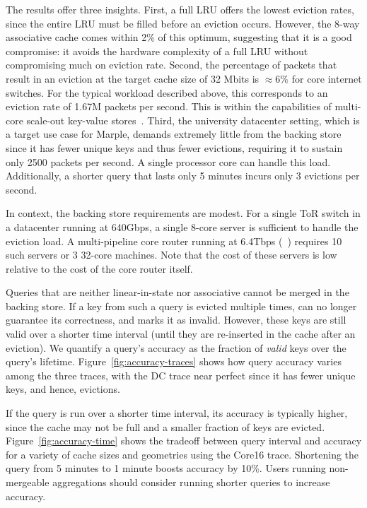 The results offer three insights. First, a full LRU offers the lowest eviction
rates, since the entire LRU must be filled before an eviction occurs. However,
the 8-way associative cache comes within 2\% of this optimum, suggesting that it
is a good compromise: it avoids the hardware complexity of a full LRU without
compromising much on eviction rate. 
Second, the percentage of packets that result in an eviction at the target cache size of 32 Mbits is $\approx6\%$ for core internet switches. For the typical workload described above, this corresponds to an eviction rate of 1.67M packets per second. This is within the capabilities of multi-core scale-out key-value stores~\cite{redis_benchmark, memcached_benchmark, redis_vs_memcached, redis_vs_memcached_update}.
Third, the university datacenter setting, which is a target use case for Marple,
demands extremely little from the backing store since it has fewer unique keys
and thus fewer evictions, requiring it to sustain only 2500 packets per
second. A single processor core can handle this load. Additionally, a shorter
query that lasts only 5 minutes incurs only 3 evictions per second.

In context, the backing store requirements are modest. For a single ToR switch in a datacenter running at 640Gbps, a single 8-core server is sufficient to handle the eviction load. A multi-pipeline core router running at 6.4Tbps (\eg~\cite{tofino}) requires 10 such servers or 3 32-core machines. Note that the cost of these servers is low relative to the cost of the core router itself.

Queries that are neither linear-in-state nor associative cannot be merged in the
backing store. If a key from such a query is evicted multiple times, \TheSystem
can no longer guarantee its correctness, and marks it as invalid. However, these
keys are still valid over a shorter time interval (until they are re-inserted in the
cache after an eviction). We quantify a query's accuracy as the fraction
of \emph{valid} keys over the query's lifetime. Figure~\ref{fig:accuracy-traces}
shows how query accuracy varies among the three traces, with the DC trace
near perfect since it has fewer unique keys, and hence, evictions.

If the query is run over a shorter time interval, its accuracy is typically higher, since the cache may not be full and a smaller fraction of keys are evicted. 
Figure~\ref{fig:accuracy-time} shows the tradeoff between query interval and accuracy for a variety of cache sizes and geometries using the Core16 trace.
Shortening the query from 5 minutes to 1 minute boosts accuracy by 10\%. Users running non-mergeable aggregations should consider running shorter queries to increase accuracy.

